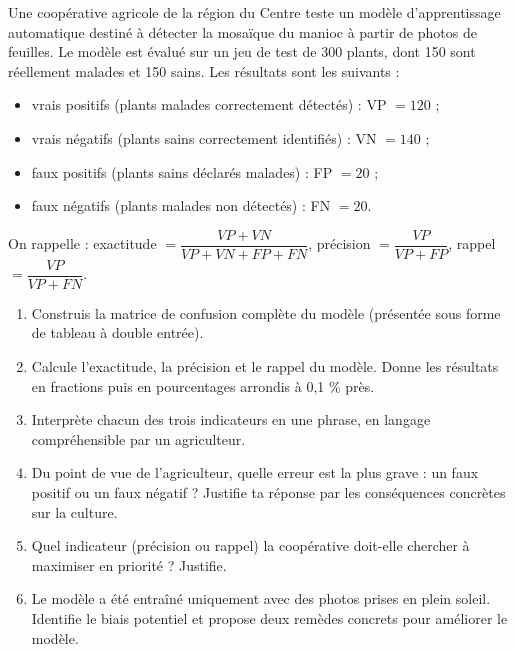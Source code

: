 \documentclass[11pt]{article}
\newcounter{popsec}
\newcounter{popsub}
\newcommand{\courssub}[1]{%
  \stepcounter{popsub}%
  \par\vspace{9pt}\noindent{\popxbold\fontsize{11.5}{13}\selectfont\color{popink}{\color{poporange}\thepopsec.\thepopsub}\hspace{6pt}#1}\par\nopagebreak\vspace{4pt}
}
\begin{document}
\courssub{Je me prépare au Bac}

\begin{exercice}
Une coopérative agricole de la région du Centre teste un modèle d'apprentissage automatique destiné à détecter la mosaïque du manioc à partir de photos de feuilles. Le modèle est évalué sur un jeu de test de 300 plants, dont 150 sont réellement malades et 150 sains. Les résultats sont les suivants :
\begin{itemize}
\item vrais positifs (plants malades correctement détectés) : VP $= 120$ ;
\item vrais négatifs (plants sains correctement identifiés) : VN $= 140$ ;
\item faux positifs (plants sains déclarés malades) : FP $= 20$ ;
\item faux négatifs (plants malades non détectés) : FN $= 20$.
\end{itemize}
On rappelle : exactitude $= \dfrac{VP + VN}{VP + VN + FP + FN}$, précision $= \dfrac{VP}{VP + FP}$, rappel $= \dfrac{VP}{VP + FN}$.

\begin{enumerate}
\item Construis la matrice de confusion complète du modèle (présentée sous forme de tableau à double entrée).
\item Calcule l'exactitude, la précision et le rappel du modèle. Donne les résultats en fractions puis en pourcentages arrondis à 0,1 \% près.
\item Interprète chacun des trois indicateurs en une phrase, en langage compréhensible par un agriculteur.
\item Du point de vue de l'agriculteur, quelle erreur est la plus grave : un faux positif ou un faux négatif ? Justifie ta réponse par les conséquences concrètes sur la culture.
\item Quel indicateur (précision ou rappel) la coopérative doit-elle chercher à maximiser en priorité ? Justifie.
\item Le modèle a été entraîné uniquement avec des photos prises en plein soleil. Identifie le biais potentiel et propose deux remèdes concrets pour améliorer le modèle.
\end{enumerate}
\end{exercice}
\end{document}
